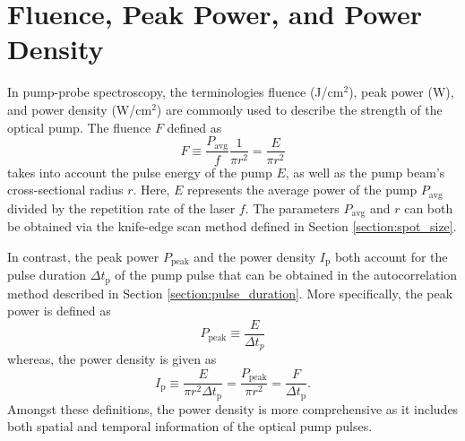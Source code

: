 \section{Fluence, Peak Power, and Power Density}
In pump-probe spectroscopy, the terminologies fluence (J/cm$^2$), peak power (W), and power density (W/cm$^2$) are commonly used to describe the strength of the optical pump. The fluence $F$ defined as
\begin{equation}
	F \equiv \dfrac{P_\text{avg}}{f} \dfrac{1}{\pi r^2} = \dfrac{E}{\pi r^2}
\end{equation}
takes into account the pulse energy of the pump $E$, as well as the pump beam's cross-sectional radius $r$. Here, $E$ represents the average power of the pump $P_\text{avg}$ divided by the repetition rate of the laser $f$. The parameters $P_\text{avg}$ and $r$ can both be obtained via the knife-edge scan method defined in Section \ref{section:spot_size}.

In contrast, the peak power $P_\text{peak}$ and the power density $I_\text{p}$ both account for the pulse duration $\Delta t_\text{p}$ of the pump pulse that can be obtained in the autocorrelation method described in Section \ref{section:pulse_duration}. More specifically, the peak power is defined as
\begin{equation}
	P_\text{peak} \equiv \dfrac{E}{\Delta t_p}
\end{equation}
whereas, the power density is given as
\begin{equation}
	I_\text{p} \equiv \dfrac{E}{\pi r^2 \Delta t_\text{p}} = \dfrac{P_\text{peak}}{\pi r^2} =\dfrac{F}{\Delta t_\text{p}}.
\end{equation}
Amongst these definitions, the power density is more comprehensive as it includes both spatial and temporal information of the optical pump pulses.
